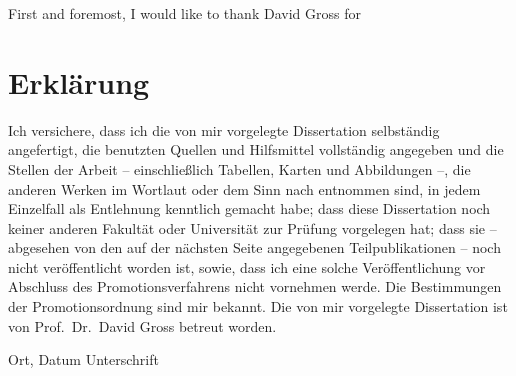 \documentclass[
  a4paper,
  11pt,
  BCOR=8mm,
  twoside,
  headsepline]{scrbook}
\begin{document}
First and foremost, I would like to thank David Gross for

\clearpage
\chapter*{Erklärung}

Ich versichere, dass ich die von mir vorgelegte Dissertation selbständig angefertigt, die benutzten Quellen und Hilfsmittel vollständig angegeben und die Stellen der Arbeit -- einschließlich Tabellen, Karten und Abbildungen --, die anderen Werken im Wortlaut oder dem Sinn nach entnommen sind, in jedem Einzelfall als Entlehnung kenntlich gemacht habe; dass diese Dissertation noch keiner anderen Fakultät oder Universität zur Prüfung vorgelegen hat; dass sie -- abgesehen von den auf der nächsten Seite angegebenen Teilpublikationen -- noch nicht veröffentlicht worden ist, sowie, dass ich eine solche Veröffentlichung vor Abschluss des Promotionsverfahrens nicht vornehmen werde.
Die Bestimmungen der Promotionsordnung sind mir bekannt.
Die von mir vorgelegte Dissertation ist von Prof.\ Dr.\ David Gross betreut worden.

\vspace{4cm}

Ort, Datum \hfill Unterschrift \hspace{2cm}
\end{document}
